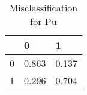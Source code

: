 \begin{table}
\caption{Misclassification for Pu}
\label{tbl:purity95}
\begin{tabular}{lll}
\toprule
 & 0 & 1 \\
\midrule
0 & 0.863 & 0.137 \\
1 & 0.296 & 0.704 \\
\bottomrule
\end{tabular}
\end{table}
